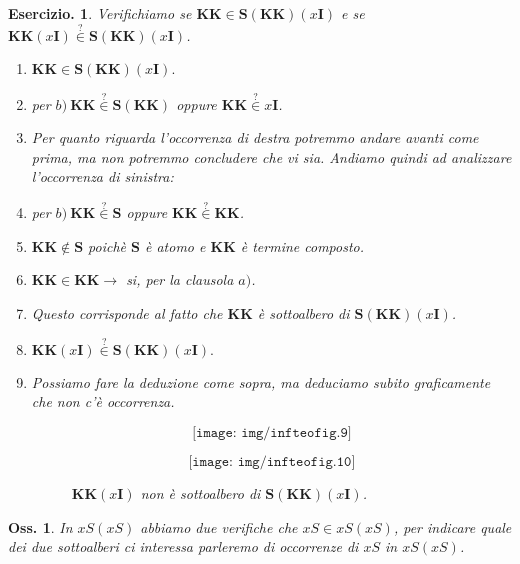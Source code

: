 \documentclass{book}
\newtheorem{osservazione}{Oss.}[chapter]
\newtheorem{ese}{Esercizio.}
\newcommand*{\ii}{\mathbf{I}}    %
\newcommand*{\kk}{\mathbf{K}}    %
\newcommand*{\sss}{\mathbf{S}}   %
\begin{document}
\begin{ese}Verifichiamo se $\kk\kk \in \sss(\kk\kk)(x\ii)$ e se
$\kk\kk(x\ii) \stackrel{?}{\in} \sss(\kk\kk)(x\ii)$.

\begin{enumerate}
\item[1)]$\kk\kk \in \sss(\kk\kk)(x\ii).$
\item[]per $b)\ \kk\kk \stackrel{?}{\in} \sss(\kk\kk)$ oppure $\kk\kk
\stackrel{?}{\in} x\ii$.
\item[]Per quanto riguarda l'occorrenza di destra potremmo andare
avanti come prima, ma non potremmo concludere che vi sia. Andiamo quindi ad
analizzare l'occorrenza di sinistra:
\item[]per $b)\ \kk\kk \stackrel{?}{\in} \sss$ oppure $\kk\kk
\stackrel{?}{\in} \kk\kk$.
\item[]$\kk\kk \notin \sss$ poich\`e $\sss$ \`e atomo e $\kk\kk$ \`e termine
composto.
\item[]$\kk\kk \in \kk\kk \longrightarrow$ si, per la clausola $a)$.
\item[]Questo corrisponde al fatto che $\kk\kk$ \`e sottoalbero di
$\sss(\kk\kk)(x\ii)$.
\item[2)]$\kk\kk(x\ii) \stackrel{?}{\in} \sss(\kk\kk)(x\ii).$
\item[]Possiamo fare la deduzione come sopra, ma deduciamo subito
graficamente che non c'\`e occorrenza.

\begin{figure}[!ht]
\[ \texttt{[image: img/infteofig.9]} \]

\[ \texttt{[image: img/infteofig.10]} \]
\caption{$\kk\kk(x\ii)$ non \`e sottoalbero di $\sss(\kk\kk)(x\ii)$.}
\end{figure}
\end{enumerate}
\end{ese}

\begin{osservazione}
In $xS(xS)$ abbiamo due verifiche che $xS \in xS(xS)$, per indicare quale dei
due sottoalberi ci interessa parleremo di occorrenze di $xS$ in $xS(xS)$.
\end{osservazione}

\end{document}
